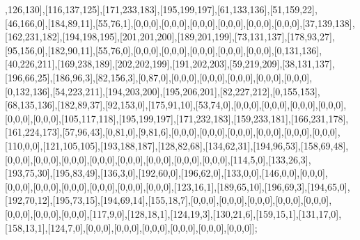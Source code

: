 ,126,130],[116,137,125],[171,233,183],[195,199,197],[61,133,136],[51,159,22],[46,166,0],[184,89,11],[55,76,1],[0,0,0],[0,0,0],[0,0,0],[0,0,0],[0,0,0],[0,0,0],[37,139,138],[162,231,182],[194,198,195],[201,201,200],[189,201,199],[73,131,137],[178,93,27],[95,156,0],[182,90,11],[55,76,0],[0,0,0],[0,0,0],[0,0,0],[0,0,0],[0,0,0],[0,131,136],[40,226,211],[169,238,189],[202,202,199],[191,202,203],[59,219,209],[38,131,137],[196,66,25],[186,96,3],[82,156,3],[0,87,0],[0,0,0],[0,0,0],[0,0,0],[0,0,0],[0,0,0],[0,132,136],[54,223,211],[194,203,200],[195,206,201],[82,227,212],[0,155,153],[68,135,136],[182,89,37],[92,153,0],[175,91,10],[53,74,0],[0,0,0],[0,0,0],[0,0,0],[0,0,0],[0,0,0],[0,0,0],[105,117,118],[195,199,197],[171,232,183],[159,233,181],[166,231,178],[161,224,173],[57,96,43],[0,81,0],[9,81,6],[0,0,0],[0,0,0],[0,0,0],[0,0,0],[0,0,0],[0,0,0],[110,0,0],[121,105,105],[193,188,187],[128,82,68],[134,62,31],[194,96,53],[158,69,48],[0,0,0],[0,0,0],[0,0,0],[0,0,0],[0,0,0],[0,0,0],[0,0,0],[0,0,0],[114,5,0],[133,26,3],[193,75,30],[195,83,49],[136,3,0],[192,60,0],[196,62,0],[133,0,0],[146,0,0],[0,0,0],[0,0,0],[0,0,0],[0,0,0],[0,0,0],[0,0,0],[0,0,0],[123,16,1],[189,65,10],[196,69,3],[194,65,0],[192,70,12],[195,73,15],[194,69,14],[155,18,7],[0,0,0],[0,0,0],[0,0,0],[0,0,0],[0,0,0],[0,0,0],[0,0,0],[0,0,0],[117,9,0],[128,18,1],[124,19,3],[130,21,6],[159,15,1],[131,17,0],[158,13,1],[124,7,0],[0,0,0],[0,0,0],[0,0,0],[0,0,0],[0,0,0],[0,0,0]];



